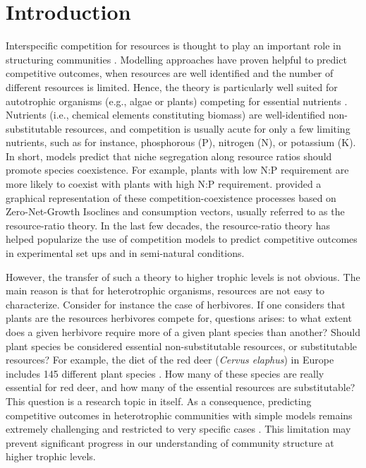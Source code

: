 \documentclass[12pt]{article}
\begin{document}
\section*{Introduction}
Interspecific competition for resources is thought to play an important role in structuring communities \citep{Gause1934,Tilman1987}. Modelling approaches have proven helpful to predict competitive outcomes, when resources are well identified and the number of different resources is limited. Hence, the theory is particularly well suited for autotrophic organisms (e.g., algae or plants) competing for essential nutrients \citep{Tilman1982}. Nutrients (i.e., chemical elements constituting biomass) are well-identified non-substitutable resources, and competition is usually acute for only a few limiting nutrients, such as for instance, phosphorous (P), nitrogen (N), or potassium (K). In short, models  predict that niche  segregation  along  resource ratios should promote species coexistence. For example,  plants with low N:P requirement are more likely to coexist  with plants with high N:P requirement. \cite{Tilman1980} provided a graphical representation of these competition-coexistence processes based on Zero-Net-Growth Isoclines and consumption vectors, usually referred  to as the resource-ratio theory. In the last few decades, the resource-ratio theory has helped  popularize the use of competition models to predict competitive outcomes in experimental set ups and in  semi-natural conditions.\par 
However, the transfer of such a theory to higher trophic levels is not obvious. The main reason is that for heterotrophic organisms, resources are not easy to characterize. Consider for instance the case of herbivores. 
If one considers that plants are the resources herbivores compete for, questions arises: to what extent does a given herbivore require more of a given plant species than another? Should plant species be considered essential non-substitutable resources, or  substitutable resources? 
For example, the diet of the red deer (\textit{Cervus elaphus}) in Europe includes 145 different plant species \citep{Gebert2001}. 
How many of these species are really essential for red deer, and how many of the essential resources are substitutable? This question is a research topic in itself. As a consequence, predicting  competitive outcomes  in  heterotrophic communities with simple models remains extremely challenging and restricted to very specific cases \citep{Murray2008}. This limitation may prevent significant progress in our understanding of community structure at higher trophic levels. \par 
\end{document}

